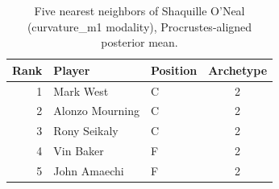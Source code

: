 \begin{table}[htbp]
  \centering\small
  \begin{tabular}{rllc}
    \toprule
    Rank & Player & Position & Archetype \\
    \midrule
    1 & Mark West & C & 2 \\
    2 & Alonzo Mourning & C & 2 \\
    3 & Rony Seikaly & C & 2 \\
    4 & Vin Baker & F & 2 \\
    5 & John Amaechi & F & 2 \\
    \bottomrule
  \end{tabular}
  \caption{Five nearest neighbors of Shaquille O'Neal (curvature_m1 modality), Procrustes-aligned posterior mean.}
  \label{tab:Shaquille_O_Neal_neighbors_curvature_m1}
\end{table}

